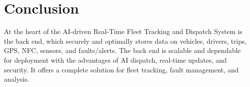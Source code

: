 \section{Conclusion}
At the heart of the AI-driven Real-Time Fleet Tracking and Dispatch System is the back end, which securely and optimally stores data on vehicles, drivers, trips, GPS, NFC, sensors, and faults/alerts. The back end is scalable and dependable for deployment with the advantages of AI dispatch, real-time updates, and security. It offers a complete solution for fleet tracking, fault management, and analysis.

